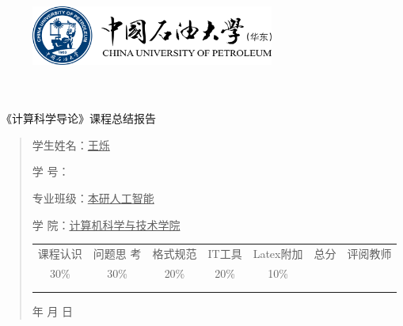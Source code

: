 \documentclass{article}
\renewcommand{\today}{\number\year 年 \number\month 月 \number\day 日}
\begin{document}
\begin{figure}
    \centering
    \includegraphics[width=8cm]{upc.png}

    \label{figupc}
\end{figure}

	\begin{center}
		\quad \\
		\quad \\
		\heiti \fontsize{45}{17} \quad \quad \quad 
		\vskip 1.5cm
		\heiti {} 《计算科学导论》课程总结报告
	\end{center}
	\vskip 2.0cm
		
	\begin{quotation}
		\doublespacing
		
        \par\setlength\parindent{7em}
		\quad 

		学生姓名：\underline{\qquad  王烁 \qquad \qquad}

		学\hspace{0.61cm} 号：\underline{\qquad}
		
		专业班级：\underline{\qquad 本研人工智能  \qquad  }
		
        学\hspace{0.61cm} 院：\underline{计算机科学与技术学院}
		\vskip 2cm
		\centering
		\begin{table}[h]
            \centering 
            \begin{tabular}{|c|c|c|c|c|c|c|}
                \hline
                课程认识 & 问题思 考 & 格式规范  & IT工具  & Latex附加  & 总分 & 评阅教师 \\
                30\% & 30\% & 20\% & 20\% & 10\% &  &  \\
                \hline
                 & & & & & &\\
                & & & & & &\\
                \hline
            \end{tabular}
        \end{table}
		\vskip 2cm
		\today
	\end{quotation}
\end{document}
